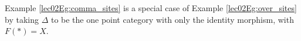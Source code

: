 \begin{remark}
 Example \ref{lec02Eg:comma_sites} is a special case of Example \ref{lec02Eg:over_sites} by taking $\Delta$ to be the one point category with only the identity morphism, with $F(\ast)=X$.
\end{remark}
